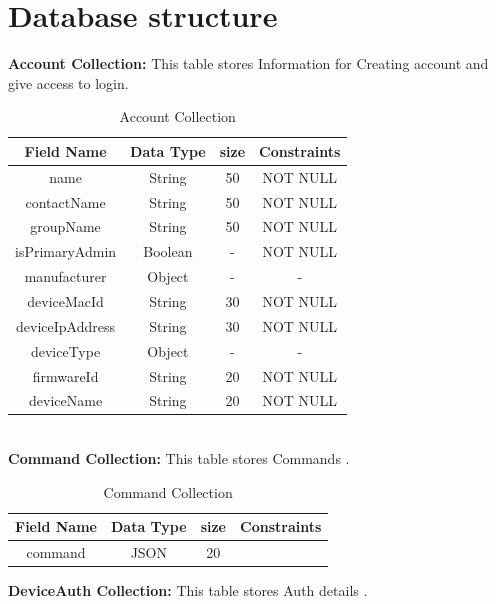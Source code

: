 		
		
		
		
		
		
		
		
 		

\section{Database structure}
\textbf{Account Collection:}  This table stores Information for Creating account and give access to login.\nolinebreak
\begin{table}[hp]
\centering

\begin{tabular}{|c|c|c|c|}
\hline
\textbf{Field Name}  & \textbf{Data Type}  & \textbf{size} &\textbf{Constraints}  \\
\hline
name & String & 50 & NOT NULL \\
\hline
contactName &	String &	50 & NOT NULL\\
\hline
groupName & String &	50 & NOT NULL\\
\hline
isPrimaryAdmin	& Boolean & - &	NOT NULL\\
\hline
manufacturer &	Object &	- &	-\\
\hline
deviceMacId &	String & 30 &	NOT NULL\\
\hline
deviceIpAddress & String & 30 & NOT NULL\\
\hline
deviceType	& Object &	- & - \\
\hline
firmwareId	& String &	20 & NOT NULL \\
\hline
deviceName	& String &	20 & NOT NULL \\
\hline

\end{tabular}
\caption{ Account Collection}
\end{table}
\\
\textbf{Command Collection:} This table stores Commands .\nolinebreak
\begin{table}[hp]
\centering
\begin{tabular}{|c|c|c|c|}
\hline
\textbf{Field Name}  & \textbf{Data Type}  & \textbf{size} &\textbf{Constraints}  \\
\hline
command & JSON &	20 & \\
\hline

\end{tabular}
\caption{Command Collection}
\end{table}


\textbf{DeviceAuth Collection:}  This table stores Auth details .\nolinebreak

